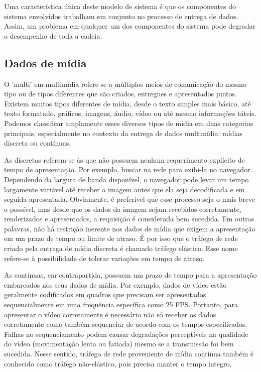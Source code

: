 \documentclass[12pt, %
openright, 
oneside, %
a4paper,    %
brazil]{facom-ufu-abntex2}
\begin{document}
Uma característica única deste modelo de sistema é que os componentes do
sistema envolvidos trabalham em conjunto no processo de entrega de dados.
Assim, um problema em qualquer um dos componentes do sistema pode degradar o
desempenho de toda a cadeia.

\subsection{Dados de mídia}

O 'multi' em multimídia refere-se a múltiplos meios de comunicação do mesmo
tipo ou de tipos diferentes que são criados, entregues e apresentados juntos.
Existem muitos tipos diferentes de mídia, desde o texto simples mais básico,
até texto formatado, gráficos, imagens, áudio, vídeo ou até mesmo informações
táteis. Podemos classificar amplamente esses diversos tipos de mídia em duas
categorias principais, especialmente no contexto da entrega de dados
multimídia: mídias discreta ou contínuas.

As discretas referem-se às que não possuem nenhum requerimento explícito de
tempo de apresentação. Por exemplo, buscar na rede para exibi-la no navegador.
Dependendo da largura de banda disponível, o navegador pode levar um tempo
largamente variável até receber a imagem antes que ela seja decodificada e em
seguida apresentada. Obviamente, é preferível que esse processo seja o mais
breve o possível, mas desde que os dados da imagem sejam recebidos
corretamente, renderizados e apresentados, a requisição é considerada bem
sucedida. Em outras palavras, não há restrição inerente nos dados de mídia que
exigem a apresentação em um prazo de tempo ou limite de atraso. É por isso que
o tráfego de rede criado pela entrega de mídia discreta é chamado tráfego
elástico. Esse nome refere-se à possibilidade de tolerar variações em tempo de
atraso.

As contínuas, em contrapartida, possuem um prazo de tempo para a apresentação
embarcados nos seus dados de mídia. Por exemplo, dados de vídeo estão
geralmente codificados em quadros que precisam ser apresentados sequencialmente
em uma frequência específica como 25 FPS. Portanto, para apresentar o vídeo
corretamente é necessário não só receber os dados corretamente como também
sequenciar de acordo com os tempos especificados. Falhas no sequenciamento
podem causar degradações perceptíveis na qualidade do vídeo (movimentação lenta
ou fatiada) mesmo se a transmissão foi bem sucedida. Nesse sentido, tráfego de
rede proveniente de mídia contínua também é conhecido como tráfego
não-elástico, pois precisa manter o tempo íntegro. \cite{lee2005scalable}
\end{document}

